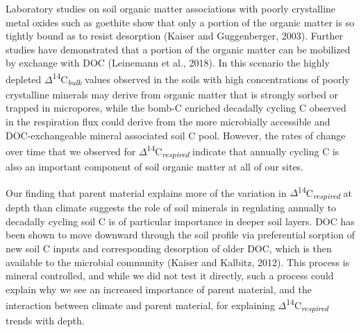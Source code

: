 \documentclass[english,man,floatsintext]{apa6}
\begin{document}
Laboratory studies on soil organic matter associations with poorly crystalline metal oxides such as goethite show that only a portion of the organic matter is so tightly bound as to resist desorption (Kaiser and Guggenberger, 2003). Further studies have demonstrated that a portion of the organic matter can be mobilized by exchange with DOC (Leinemann et al., 2018). In this scenario the highly depleted \(\Delta\)\textsuperscript{14}C\textsubscript{\emph{bulk}} values observed in the soils with high concentrations of poorly crystalline minerals may derive from organic matter that is strongly sorbed or trapped in micropores, while the bomb-C enriched decadally cycling C observed in the respiration flux could derive from the more microbially accessible and DOC-exchangeable mineral associated soil C pool. However, the rates of change over time that we observed for \(\Delta\)\textsuperscript{14}C\textsubscript{\emph{respired}} indicate that annually cycling C is also an important component of soil organic matter at all of our sites.

Our finding that parent material explains more of the variation in \(\Delta\)\textsuperscript{14}C\textsubscript{\emph{respired}} at depth than climate suggests the role of soil minerals in regulating annually to decadally cycling soil C is of particular importance in deeper soil layers. DOC has been shown to move downward through the soil profile via preferential sorption of new soil C inputs and corresponding desorption of older DOC, which is then available to the microbial community (Kaiser and Kalbitz, 2012). This process is mineral controlled, and while we did not test it directly, such a process could explain why we see an increased importance of parent material, and the interaction between climate and parent material, for explaining \(\Delta\)\textsuperscript{14}C\textsubscript{\emph{respired}} trends with depth.
\end{document}
